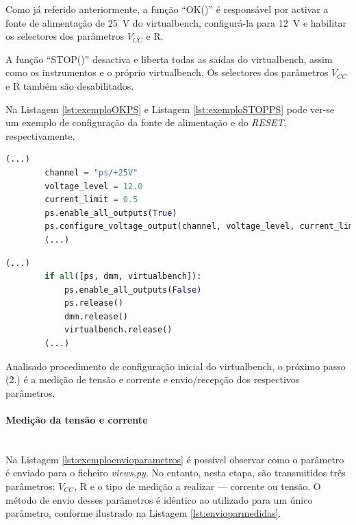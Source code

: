 Como já referido anteriormente, a função ``OK()'' é responsável por activar a fonte de alimentação de \SI{25}{\volt} do \acrshort{virtualbench}, configurá-la para \SI{12}{\volt} e habilitar os selectores dos parâmetros $V_{CC}$ e R. 


A função ``STOP()'' desactiva e liberta todas as saídas do \acrshort{virtualbench}, assim como os instrumentos e o próprio \acrshort{virtualbench}. Os selectores dos parâmetros $V_{CC}$ e R também são desabilitados.

Na Listagem \ref{lst:exemploOKPS} e Listagem \ref{lst:exemploSTOPPS} pode ver-se um exemplo de configuração da fonte de alimentação e do \textit{RESET}, respectivamente. 

\begin{minipage}{0.9\linewidth}
	\begin{lstlisting}[language=python, escapechar=|, caption=Exemplo de configuração: fonte de alimentação - OK, label=lst:exemploOKPS]
		(...)
		channel = "ps/+25V"
		voltage_level = 12.0
		current_limit = 0.5 
		ps.enable_all_outputs(True)
		ps.configure_voltage_output(channel, voltage_level, current_limit)
		(...)
	\end{lstlisting}
\end{minipage}

\begin{minipage}{0.9\linewidth}
	\begin{lstlisting}[language=python, escapechar=|, caption=Exemplo de configuração: fonte de alimentação - STOP, label=lst:exemploSTOPPS]
		(...)
		if all([ps, dmm, virtualbench]):
		   	ps.enable_all_outputs(False)
        	ps.release()
        	dmm.release()
        	virtualbench.release()
		(...)
	\end{lstlisting}
\end{minipage}

Analisado procedimento de configuração inicial do \acrshort{virtualbench}, o próximo passo (2.) é a medição de tensão e corrente e envio/recepção dos respectivos parâmetros.

\paragraph{Medição da tensão e corrente} ~\\
Na Listagem \ref{lst:exemploenvioparametros} é possível observar como o parâmetro é enviado para o ficheiro \textit{views.py}. No entanto, nesta etapa, são transmitidos três parâmetros: $V_{CC}$, R e o tipo de medição a realizar — corrente ou tensão. O método de envio desses parâmetros é idêntico ao utilizado para um único parâmetro, conforme ilustrado na Listagem \ref{lst:envioparmedidas}.

